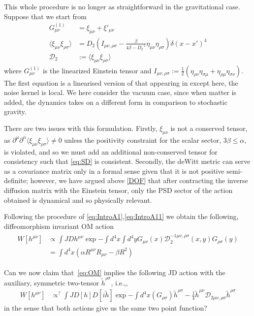 \documentclass[aps,preprintnumbers,superscriptaddress,longbibliography]{revtex4-1}
\begin{document}
This whole procedure is no longer as straightforward in the gravitational case. Suppose that we start from 
\begin{align}
\label{eq:SD}
    G_{\mu \nu}^{(1)}&=\xi_{\mu \nu}+\xi'_{\mu\nu}\\
 \langle\xi_{\mu \nu}\xi_{\rho\sigma}\rangle&=D_2(I_{\mu\nu,\rho\sigma}-\frac{\beta}{4\beta-D^{-1}_2}\eta_{\mu\nu}\eta_{\rho\sigma})\delta(x-x')^{4}\\\mathcal{D}_2&:= \langle\xi_{\mu \nu}\xi_{\rho\sigma}\rangle
\end{align}
where $G_{\mu \nu}^{(1)}$ is the linearized Einstein tensor and $I_{\mu\nu,\rho\sigma}:=\frac{1}{2}(\eta_{\rho\nu}\eta_{\sigma\mu}+\eta_{\rho\mu}\eta_{\sigma\nu})$. The first equation is a linearised version of that appearing in  \cite{hu2008stochastic,moffat1997stochastic} except here, the noise kernel is local. We here consider the vacuum case, since when matter is added, the dynamics takes on a different form in comparison to stochastic gravity.

There are two issues with this formulation. Firstly, $\xi_{\mu\nu}$ is not a conserved tensor, as $\partial^\mu\partial^\alpha\langle\xi_{\mu \nu}\xi_{\rho\sigma}\rangle\neq0$ unless the positivity constraint for the scalar sector, $3\beta\leq \alpha$, is violated, and so we must add an additional non-conserved tensor for consistency such that  \eqref{eq:SD} is consistent. Secondly, the deWitt metric can serve as  a covariance matrix only in a formal sense given that it is not positive semi-definite; however, we have argued above \ref{DOF} that after contracting the inverse diffusion matrix with the Einstein tensor, only the PSD sector of the action obtained is dynamical and so physically relevant.

Following the procedure of \eqref{eq:IntroA1},\eqref{eq:IntroA11} we obtain the following, diffeomorphism invariant OM action
\begin{align}
\begin{split}
     \label{eq:OM}W[h^{\mu\nu}]&\propto\int J Dh^{\mu\nu} \exp{-\int d^4x \int d^4yG_{\mu\nu}(x)\mathcal{D}_2^{-1\mu\nu,\rho\sigma}(x,y)G_{\rho\sigma}(y)}\\&=\int d^4x (\alpha R^{\mu\nu}R_{\mu\nu}-\beta R^2)
     \end{split}
\end{align}

Can we now claim that~\eqref{eq:OM} implies the following JD action with the auxiliary, symmetric two-tensor $\tilde{h}^{\rho\sigma}$, i.e.,,
\begin{align}
     \label{eq:MSR}W[h^{\mu\nu}]&\propto^{?}\int J D[h] D[i\tilde{h}] \exp{-\int d^4x (G_{\rho\sigma})\tilde{h}^{\rho\sigma}-\frac{1}{4}\tilde{h}^{\mu\nu}\mathcal{D}_{2\mu\nu,\rho\sigma}\tilde{h}^{\rho\sigma}}
\end{align}in the sense that both actions give us the same two point function? 
\end{document}
